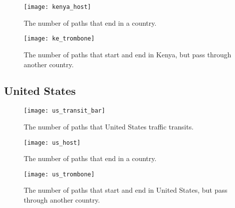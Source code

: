 \begin{figure}[t!]
\centering
\texttt{[image: kenya\_host]}
\caption{The number of paths that end in a country.}
\label{fig:host_ke}
\end{figure} 

\begin{figure}
\centering
\texttt{[image: ke\_trombone]}
\caption{The number of paths that start and end in Kenya, but pass through another country.}
\label{fig:trombone_ke}
\end{figure}

\subsection{United States}

\begin{figure}
\centering
\texttt{[image: us\_transit\_bar]}
\caption{The number of paths that United States traffic transits.}
\label{fig:transit_us}
\end{figure}

\begin{figure}[t!]
\centering
\texttt{[image: us\_host]}
\caption{The number of paths that end in a country.}
\label{fig:host_us}
\end{figure} 

\begin{figure}
\centering
\texttt{[image: us\_trombone]}
\caption{The number of paths that start and end in United States, but pass through another country.}
\label{fig:trombone_us}
\end{figure}
